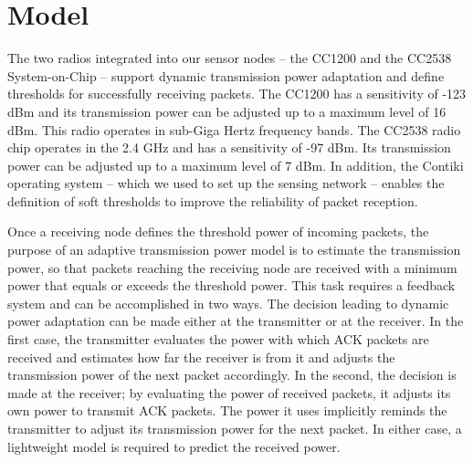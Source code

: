 \section{Model}
\label{sec:model}

The two radios integrated into our sensor nodes -- the CC1200 \cite{instruments2013cc1200} and the CC2538 System-on-Chip \cite{instruments2013cc2538} -- support dynamic transmission power adaptation and define thresholds for successfully receiving packets. The CC1200 has a sensitivity of -123 dBm and its transmission power can be adjusted up to a maximum level of 16 dBm. This radio operates in sub-Giga Hertz frequency bands. The CC2538 radio chip operates in the 2.4 GHz and has a sensitivity of -97 dBm. Its transmission power can be adjusted up to a maximum level of 7 dBm. In addition, the Contiki operating system  \cite{oikonomou2022contiki} -- which we used to set up the sensing network -- enables the definition of soft thresholds to improve the reliability of packet reception. 

Once a receiving node defines the threshold power of incoming packets, the purpose of an adaptive transmission power model is to estimate the transmission power, so that packets reaching the receiving node are received with a minimum power that equals or exceeds the threshold power. This task requires a feedback system and can be accomplished in two ways. The decision leading to dynamic power adaptation can be made either at the transmitter or at the receiver. In the first case, the transmitter evaluates the power with which ACK packets are received and estimates how far the receiver is from it and adjusts the transmission power of the next packet accordingly. In the second, the decision is made at the receiver; by evaluating the power of received packets, it adjusts its own power to transmit ACK packets. The power it uses implicitly reminds the transmitter to adjust its transmission power for the next packet. In either case, a lightweight model is required to predict the received power.

